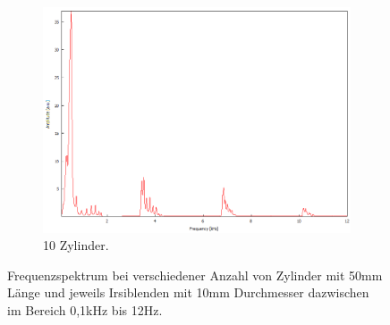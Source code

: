 \begin{figure}
\begin{subfigure}[b]{0.3\textwidth}
        \includegraphics[width=\textwidth]{data/4_2/10mm_10zylinder.png}
        \caption{10 Zylinder.}
    \end{subfigure}
    \hfill
    \caption{Frequenzspektrum bei verschiedener Anzahl von Zylinder mit 50\;mm Länge und jeweils Irsiblenden mit 10\;mm Durchmesser dazwischen im Bereich 0,1\;kHz bis 12\;Hz.}
    \label{fig:allesgleich10}
\end{figure}
